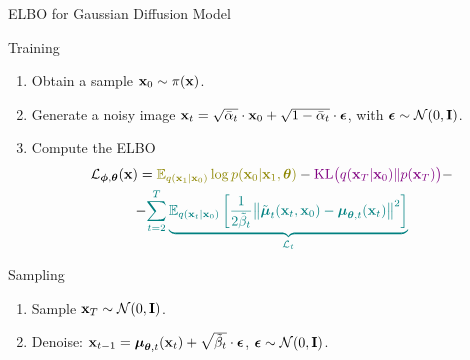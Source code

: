 \documentclass{beamer}
\begin{document}
\begin{frame}{ELBO for Gaussian Diffusion Model}
    \begin{block}{Training}
        \begin{enumerate}
            \item Obtain a sample $\mathbf{x}_0 \sim \pi(\mathbf{x})$.
            \item Generate a noisy image $\mathbf{x}_t = \sqrt{\bar{\alpha}_t} \cdot \mathbf{x}_0 + \sqrt{1 - \bar{\alpha}_t} \cdot \boldsymbol{\epsilon}$, with $\boldsymbol{\epsilon} \sim \mathcal{N}(0, \mathbf{I})$.
            \item Compute the ELBO
            \vspace{-0.3cm}
            \begin{multline*}
                \cL_{\bphi, \btheta}(\bx) =  {\color{olive}\bbE_{q(\bx_1 | \bx_0)} \log p(\bx_0 | \bx_1, \btheta)} - {\color{violet}\KL\bigl(q(\bx_T | \bx_0) \| p(\bx_T)\bigr)} - \\
                - {\color{teal}\sum_{t=2}^T \underbrace{ \bbE_{q(\bx_t | \bx_0)} \left[\frac{1}{2\tilde{\beta}_t} \bigl\| \tilde{\bmu}_t(\bx_t, \bx_0) - \bmu_{\btheta, t}(\bx_t) \bigr\|^2  \right]}_{\cL_t}}
            \end{multline*}
            \vspace{-0.7cm}
        \end{enumerate}
    \end{block}
    \begin{block}{Sampling}
        \begin{enumerate}
            \item Sample $\mathbf{x}_T \sim \mathcal{N}(0, \mathbf{I})$.
            \item Denoise: $\mathbf{x}_{t - 1} = \boldsymbol{\mu}_{\boldsymbol{\theta}, t}(\mathbf{x}_t) +  \sqrt{\tilde{\beta}_t} \cdot \boldsymbol{\epsilon}$, $\boldsymbol{\epsilon} \sim \mathcal{N}(0, \mathbf{I})$.
        \end{enumerate}
    \end{block}
\end{frame}
\end{document}
